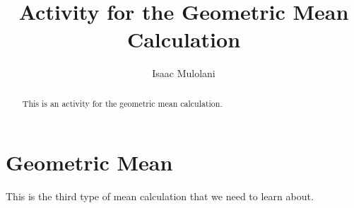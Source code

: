 \documentclass{ximera}
\title{Activity for the Geometric Mean Calculation}
\author{Isaac Mulolani}
\begin{document}
\begin{abstract}
This is an activity for the geometric mean calculation.
\end{abstract}

\maketitle


\section*{Geometric Mean}


This is the third type of mean calculation that we need to learn about.

\begin{question}

\end{question}



\begin{question}


\end{question}


\begin{question}



\end{question}


\begin{question}



\end{question}


\begin{question}



\end{question}
\end{document}
